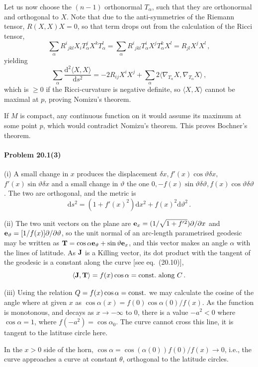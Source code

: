 \documentclass[a4paper,12pt]{article}
\def\d{\mathrm{d}}
\newcommand{\problem}[1]{\paragraph{Problem #1}}
\begin{document}
Let us now choose the $(n-1)$ orthonormal $T_\alpha$, such that they are orthonormal and orthogonal to $X$.
Note that due to the anti-symmetries of the Riemann tensor, $R(X,X)X=0$, so that term drops out from the calculation of the Ricci tensor,
\[
 \sum_\alpha R^i{}_{jkl} X_i T^j_\alpha X^k T_\alpha^l = \sum_\alpha R^i{}_{jkl}T^i_\alpha X^j T^k_\alpha X^l = R_{jl}X^jX^l\,,
\]
yielding
\[
 \sum_\alpha \frac{\d^2\langle X, X\rangle}{\d s^2} = -2R_{ij}X^i X^j +\sum_\alpha 2\langle \nabla_{T_\alpha}X, \nabla_{T_\alpha}X\rangle\,,
\]
which is $\ge 0$ if the Ricci-curvature is negative definite, so $\langle X, X\rangle$ cannot be maximal at $p$, proving Nomizu's theorem.

If $M$ is compact, any continuous function on it would assume its maximum at some point $p$, which would contradict Nomizu's theorem. This proves Bochner's theorem.


\problem{20.1(3)} \hspace{1em}(i) A small change in $x$ produces the displacement $\delta x, f'(x)\cos\vartheta\delta x,$ $f'(x)\sin\vartheta\delta x$ and a small change in $\vartheta$ the one $0, -f(x)\sin\vartheta \delta\vartheta, f(x)\cos\vartheta\delta\vartheta$. The two are orthogonal, and the metric is
\[
 \d s^2 = (1+f'(x)^2)\d x^2 + f(x)^2\d\vartheta^2\,.
\]

(ii) The two unit vectors on the plane are ${\bf e}_x = (1/\sqrt{1+f'{}^2}) \partial/\partial x$ and ${\bf e}_\vartheta = [1/f(x)] \partial/\partial\vartheta$, so the unit normal of an arc-length parametrised geodesic may be written as ${\bf T} = \cos\alpha {\bf e}_\vartheta + \sin\vartheta {\bf e}_x$, and this vector makes an angle $\alpha$ with the lines of latitude. As ${\bf J}$ is a Killing vector, its dot product with the tangent of the geodesic is a constant along the curve [see eq.\ (20.10)],
\[
 \langle {\bf J}, {\bf T}\rangle = f(x)\cos\alpha = \text{const.\ along } C\,.
\]

(iii) Using the relation $Q=f(x)\cos\alpha = {\rm const.}$ we may calculate the cosine of the angle where at given $x$ as $\cos\alpha(x) = f(0)\cos\alpha(0) / f(x)$. As the function is monotonous, and decays as $x\to-\infty$ to 0, there is a value $-a^2 < 0$ where $\cos\alpha =1$, where $f(-a^2) = \cos\alpha_0$. The curve cannot cross this line, it is tangent to the latituse circle here.

In the $x>0$ side of the horn, $\cos\alpha = \cos(\alpha(0) ) f(0)/f(x) \to 0$, i.e., the curve approaches a curve at constant $\theta$, orthogonal to the latitude circles.
\end{document}

